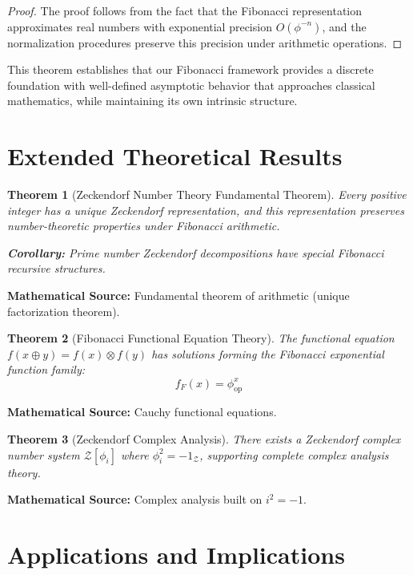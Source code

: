 \documentclass[12pt]{article}
\theoremstyle{plain}
\newtheorem{theorem}{Theorem}[section]
\theoremstyle{definition}
\begin{document}
\begin{proof}
The proof follows from the fact that the Fibonacci representation approximates real numbers with exponential precision $O(\phi^{-n})$, and the normalization procedures preserve this precision under arithmetic operations.
\end{proof}

This theorem establishes that our Fibonacci framework provides a discrete foundation with well-defined asymptotic behavior that approaches classical mathematics, while maintaining its own intrinsic structure.

\section{Extended Theoretical Results}

\begin{theorem}[Zeckendorf Number Theory Fundamental Theorem]
Every positive integer has a unique Zeckendorf representation, and this representation preserves number-theoretic properties under Fibonacci arithmetic.

\textbf{Corollary:} Prime number Zeckendorf decompositions have special Fibonacci recursive structures.
\end{theorem}

\textbf{Mathematical Source:} Fundamental theorem of arithmetic (unique factorization theorem).

\begin{theorem}[Fibonacci Functional Equation Theory] 
The functional equation $f(x \oplus y) = f(x) \otimes f(y)$ has solutions forming the Fibonacci exponential function family:
$$f_F(x) = \phi_{\text{op}}^x$$
\end{theorem}

\textbf{Mathematical Source:} Cauchy functional equations.

\begin{theorem}[Zeckendorf Complex Analysis]
There exists a Zeckendorf complex number system $\mathcal{Z}[\phi_i]$ where $\phi_i^2 = -1_\mathcal{Z}$, supporting complete complex analysis theory.
\end{theorem}

\textbf{Mathematical Source:} Complex analysis built on $i^2 = -1$.

\section{Applications and Implications}
\end{document}
